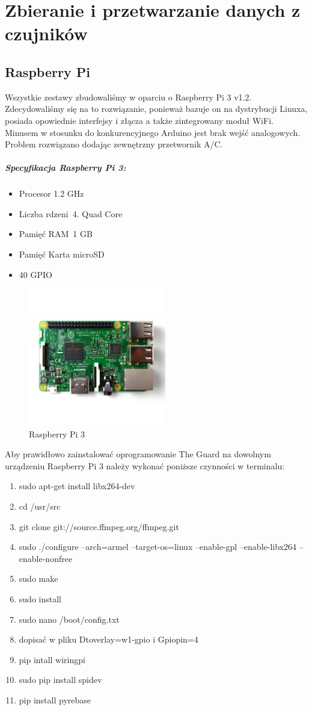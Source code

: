 \chapter{Zbieranie i przetwarzanie danych z czujników}

\section*{Raspberry Pi}

Wszystkie zestawy zbudowaliśmy w oparciu o Raspberry Pi 3 v1.2. Zdecydowaliśmy się na to rozwiązanie, ponieważ bazuje on na dystrybucji Linuxa, posiada opowiednie interfejsy i złącza a także zintegrowany moduł WiFi. Minusem w stosunku do konkurencyjnego Arduino jest brak wejść analogowych. Problem rozwiązano dodając zewnętrzny przetwornik A/C.
\paragraph{Specyfikacja Raspberry Pi 3:}
\begin{itemize} 
\item Procesor 1.2 GHz
\item Liczba rdzeni 4. Quad Core
\item Pamięć RAM 1 GB
\item Pamięć Karta microSD
\item 40 GPIO
\end{itemize}
\begin{figure}[h]
	\centering
	\includegraphics[width=6cm]{raspberry.jpg}
	\caption{Raspberry Pi 3}
\end{figure}
Aby prawidłowo zainstalować oprogramowanie The Guard na dowolnym urządzeniu Raspberry Pi 3 należy wykonać poniższe czynności w terminalu:
\begin{enumerate} 
\item sudo apt-get install libx264-dev
\item cd /usr/src
\item git clone git://source.ffmpeg.org/ffmpeg.git
\item sudo ./configure --arch=armel --target-os=linux --enable-gpl --enable-libx264 --enable-nonfree
\item sudo make
\item sudo install
\item sudo nano /boot/config.txt
\item dopisać w pliku Dtoverlay=w1-gpio i Gpiopin=4
\item pip intall wiringpi
\item sudo pip install spidev
\item pip install pyrebase
\end{enumerate}
